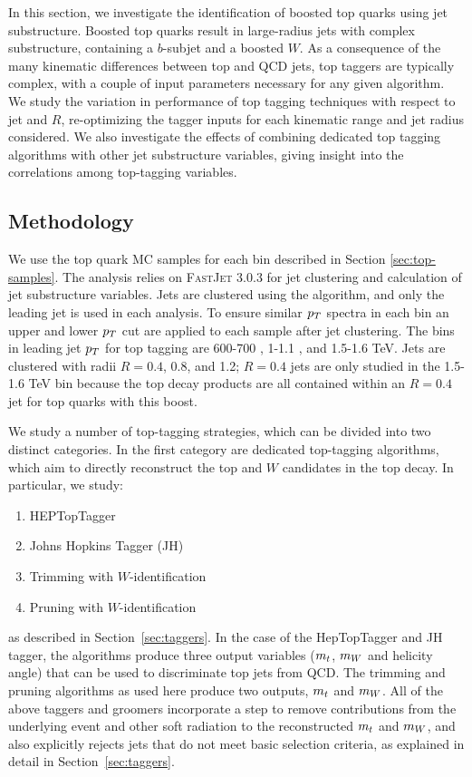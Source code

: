 In this section, we investigate the identification of boosted top quarks using jet substructure. Boosted top quarks result in large-radius jets with complex substructure, containing a $b$-subjet and a boosted $W$. As a consequence of the many kinematic differences between top and QCD jets, top taggers are typically complex, with a couple of input parameters necessary for any given algorithm. We study the variation in performance of top tagging techniques with respect to jet \pt and $R$, re-optimizing the tagger inputs for each kinematic range and jet radius considered. We also investigate the effects of combining dedicated top tagging algorithms with other jet substructure variables, giving insight into the correlations among top-tagging variables.


\subsection{Methodology}\label{sec:topmethod}

We use the top quark MC samples for each bin described in Section \ref{sec:top-samples}. The analysis  relies on \textsc{FastJet} 3.0.3 for jet clustering and
calculation of jet substructure variables. Jets are clustered using the \antikt algorithm, and only the leading jet is used in each analysis. To ensure similar $p_T$ spectra in each bin an upper and lower $p_T$ cut are applied to each sample after jet clustering. The bins in leading jet $p_T$
 for top tagging are 600-700 \GeV, 1-1.1 \TeV, and
1.5-1.6 TeV. Jets are clustered with radii $R=0.4$, 0.8, and 1.2; $R=0.4$ jets are only studied in the 1.5-1.6 TeV bin
because the top decay products are all contained within an $R=0.4$ jet for top quarks with this boost.

We study a number of top-tagging strategies, which can be divided into two distinct categories. In the first category are dedicated top-tagging algorithms, which aim to directly reconstruct the top and $W$ candidates in the top decay. In particular, we study:
%
\begin{enumerate}
\item HEPTopTagger
\item Johns Hopkins Tagger (JH)
\item Trimming with $W$-identification
\item Pruning with $W$-identification
\end{enumerate}
%
as described in Section~\ref{sec:taggers}. 
In the case of the HepTopTagger and JH tagger, the algorithms produce three output variables ($m_{t}$, $m_{W}$ and helicity angle) that can be used to discriminate top jets from QCD. The trimming and pruning algorithms as used here produce two outputs, $m_{t}$ and $m_{W}$. All of the above taggers and groomers incorporate a step to remove contributions from the underlying event and other soft radiation to the reconstructed $m_{t}$ and $m_{W}$, and also explicitly rejects jets that do not meet basic selection criteria, as explained in detail in Section~\ref{sec:taggers}.


